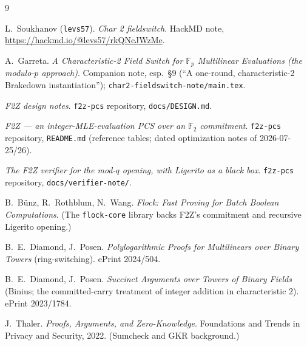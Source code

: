 \documentclass[11pt]{article}
\newcommand{\F}{\mathbb{F}}
\theoremstyle{plain}
\theoremstyle{definition}
\theoremstyle{remark}
\begin{document}
\begin{thebibliography}{9}\small

 L.~Soukhanov (\texttt{levs57}).
\emph{Char 2 fieldswitch}. HackMD note,
\url{https://hackmd.io/@levs57/rkQNcJWzMe}.

 A.~Garreta.
\emph{A Characteristic-2 Field Switch for $\F_p$ Multilinear Evaluations
(the modulo-$p$ approach)}. Companion note, esp.\ \S9
(``A one-round, characteristic-2 Brakedown instantiation'');
\texttt{char2-fieldswitch-note/main.tex}.

 \emph{F2Z design notes}.
\texttt{f2z-pcs} repository, \texttt{docs/DESIGN.md}.

 \emph{F2Z --- an integer-MLE-evaluation PCS over an
$\F_2$ commitment}. \texttt{f2z-pcs} repository, \texttt{README.md}
(reference tables; dated optimization notes of 2026-07-25/26).

 \emph{The F2Z verifier for the mod-$q$ opening, with
Ligerito as a black box}. \texttt{f2z-pcs} repository,
\texttt{docs/verifier-note/}.

 B.~B\"unz, R.~Rothblum, N.~Wang.
\emph{Flock: Fast Proving for Batch Boolean Computations}. (The
\texttt{flock-core} library backs F2Z's commitment and recursive Ligerito
opening.)

 B.~E.~Diamond, J.~Posen.
\emph{Polylogarithmic Proofs for Multilinears over Binary Towers}
(ring-switching). ePrint 2024/504.

 B.~E.~Diamond, J.~Posen.
\emph{Succinct Arguments over Towers of Binary Fields} (Binius; the
committed-carry treatment of integer addition in characteristic 2).
ePrint 2023/1784.

 J.~Thaler.
\emph{Proofs, Arguments, and Zero-Knowledge}. Foundations and Trends in
Privacy and Security, 2022. (Sumcheck and GKR background.)

\end{thebibliography}
\end{document}
